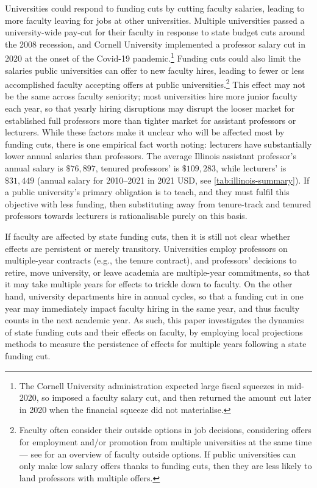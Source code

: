 Universities could respond to funding cuts by cutting faculty salaries, leading to more faculty leaving for jobs at other universities.
Multiple universities passed a university-wide pay-cut for their faculty in response to state budget cuts around the 2008 recession, and Cornell University implemented a professor salary cut in 2020 at the onset of the Covid-19 pandemic.\footnote{
    The Cornell University administration expected large fiscal squeezes in mid-2020, so imposed a faculty salary cut, and then returned the amount cut later in 2020 when the financial squeeze did not materialise.}
Funding cuts could also limit the salaries public universities can offer to new faculty hires, leading to fewer or less accomplished faculty accepting offers at public universities.\footnote{
    Faculty often consider their outside options in job decisions, considering offers for employment and/or promotion from multiple universities at the same time --- see \cite{blackaby2005} for an overview of faculty outside options.
    If public universities can only make low salary offers thanks to funding cuts, then they are less likely to land professors with multiple offers.
}
This effect may not be the same across faculty seniority; most universities hire more junior faculty each year, so that yearly hiring disruptions may disrupt the looser market for established full professors more than tighter market for assistant professors or lecturers.
While these factors make it unclear who will be affected most by funding cuts, there is one empirical fact worth noting: lecturers have substantially lower annual salaries than professors.
The average Illinois assistant professor's annual salary is $\$76,897$, tenured professors' is $\$109,283$, while lecturers' is $\$31,449$ (annual salary for 2010--2021 in 2021 USD, see \autoref{tab:illinois-summary}).
If a public university's primary obligation is to teach, and they must fulfil this objective with less funding, then substituting away from tenure-track and tenured professors towards lecturers is rationalisable purely on this basis.

If faculty are affected by state funding cuts, then it is still not clear whether effects are persistent or merely transitory.
Universities employ professors on multiple-year contracts (e.g., the tenure contract), and professors' decisions to retire, move university, or leave academia are multiple-year commitments, so that it may take multiple years for effects to trickle down to faculty.
On the other hand, university departments hire in annual cycles, so that a funding cut in one year may immediately impact faculty hiring in the same year, and thus faculty counts in the next academic year.
As such, this paper investigates the dynamics of state funding cuts and their effects on faculty, by employing local projections methods to measure the persistence of effects for multiple years following a state funding cut.
